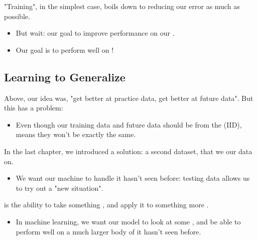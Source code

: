         "Training", in the simplest case, boils down to reducing our error as much as possible.

            \begin{itemize}
                \item But wait: our goal  to improve performance on our . 

                \item Our goal is to perform well on !
            \end{itemize}

    \phantom{}
        
    \subsection{Learning to Generalize}
            
        Above, our idea was, "get better at practice data, get better at future data". But this has a problem:

        \begin{itemize}
            \item Even though our training data and future data should be from the  (IID),  means they won't be exactly the same.
        \end{itemize}

        In the last chapter, we introduced a solution: a second dataset, that we  our data on.

        \begin{itemize}
            \item We want our machine to handle  it hasn't seen before: testing data allows us to try out a "new situation".\\
        \end{itemize}

        \begin{definition}
             is the ability to take something , and apply it to something more .

            \begin{itemize}
                \item In machine learning, we want our model to look at some , and be able to perform well on a much larger body of  it hasn't seen before.
            \end{itemize}
        \end{definition}
        
